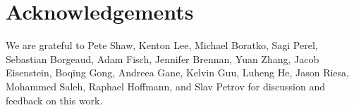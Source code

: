 
\section*{Acknowledgements}

We are grateful to Pete Shaw, Kenton Lee, Michael Boratko, Sagi Perel, Sebastian Borgeaud, Adam Fisch, Jennifer Brennan, Yuan Zhang, Jacob Eisenstein, Boqing Gong, Andreea Gane, Kelvin Guu, Luheng He, Jason Riesa, Mohammed Saleh, Raphael Hoffmann, and Slav Petrov for discussion and feedback on this work.